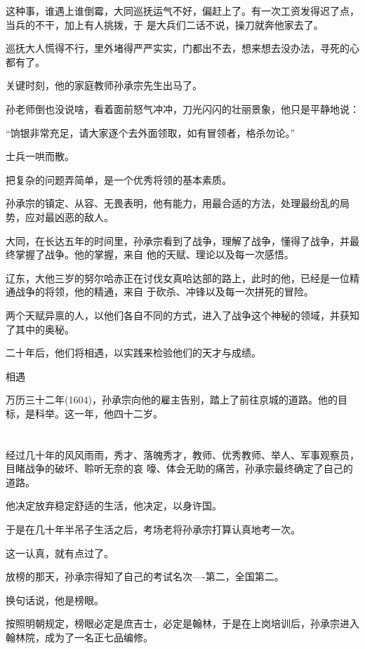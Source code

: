 \documentclass[11pt,a4paper,onecolumn]{article}
\begin{document}
这种事，谁遇上谁倒霉，大同巡抚运气不好，偏赶上了。有一次工资发得迟了点，当兵的不干，加上有人挑拨，于
是大兵们二话不说，操刀就奔他家去了。

巡抚大人慌得不行，里外堵得严严实实，门都出不去，想来想去没办法，寻死的心都有了。

关键时刻，他的家庭教师孙承宗先生出马了。

孙老师倒也没说啥，看着面前怒气冲冲，刀光闪闪的壮丽景象，他只是平静地说：

``饷银非常充足，请大家逐个去外面领取，如有冒领者，格杀勿论。''

士兵一哄而散。

把复杂的问题弄简单，是一个优秀将领的基本素质。

孙承宗的镇定、从容、无畏表明，他有能力，用最合适的方法，处理最纷乱的局势，应对最凶恶的敌人。

大同，在长达五年的时间里，孙承宗看到了战争，理解了战争，懂得了战争，并最终掌握了战争。他的掌握，来自
他的天赋、理论以及每一次感悟。

辽东，大他三岁的努尔哈赤正在讨伐女真哈达部的路上，此时的他，已经是一位精通战争的将领，他的精通，来自
于砍杀、冲锋以及每一次拼死的冒险。

两个天赋异禀的人，以他们各自不同的方式，进入了战争这个神秘的领域，并获知了其中的奥秘。

二十年后，他们将相遇，以实践来检验他们的天才与成绩。

相遇

万历三十二年(1604)，孙承宗向他的雇主告别，踏上了前往京城的道路。他的目标，是科举。这一年，他四十二岁。

\section[\thesection]{}

经过几十年的风风雨雨，秀才、落魄秀才，教师、优秀教师、举人、军事观察员，目睹战争的破坏、聆听无奈的哀
嚎、体会无助的痛苦，孙承宗最终确定了自己的道路。

他决定放弃稳定舒适的生活，他决定，以身许国。

于是在几十年半吊子生活之后，考场老将孙承宗打算认真地考一次。

这一认真，就有点过了。

放榜的那天，孙承宗得知了自己的考试名次----第二，全国第二。

换句话说，他是榜眼。

按照明朝规定，榜眼必定是庶吉士，必定是翰林，于是在上岗培训后，孙承宗进入翰林院，成为了一名正七品编修。
\end{document}
